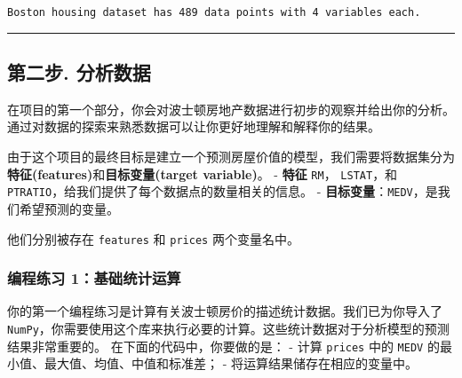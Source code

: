 \documentclass[11pt]{article}
\begin{document}
    \begin{Verbatim}[commandchars=\\\{\}]
Boston housing dataset has 489 data points with 4 variables each.

    \end{Verbatim}

    \begin{center}\rule{0.5\linewidth}{\linethickness}\end{center}

\subsection{第二步.
分析数据}\label{ux7b2cux4e8cux6b65.-ux5206ux6790ux6570ux636e}

在项目的第一个部分，你会对波士顿房地产数据进行初步的观察并给出你的分析。通过对数据的探索来熟悉数据可以让你更好地理解和解释你的结果。

由于这个项目的最终目标是建立一个预测房屋价值的模型，我们需要将数据集分为\textbf{特征(features)}和\textbf{目标变量(target
variable)}。 - \textbf{特征}
\texttt{\textquotesingle{}RM\textquotesingle{}}，
\texttt{\textquotesingle{}LSTAT\textquotesingle{}}，和
\texttt{\textquotesingle{}PTRATIO\textquotesingle{}}，给我们提供了每个数据点的数量相关的信息。
-
\textbf{目标变量}：\texttt{\textquotesingle{}MEDV\textquotesingle{}}，是我们希望预测的变量。

他们分别被存在 \texttt{features} 和 \texttt{prices} 两个变量名中。

    \subsubsection{编程练习
1：基础统计运算}\label{ux7f16ux7a0bux7ec3ux4e60-1ux57faux7840ux7edfux8ba1ux8fd0ux7b97}

你的第一个编程练习是计算有关波士顿房价的描述统计数据。我们已为你导入了
\texttt{NumPy}，你需要使用这个库来执行必要的计算。这些统计数据对于分析模型的预测结果非常重要的。
在下面的代码中，你要做的是： - 计算 \texttt{prices} 中的
\texttt{\textquotesingle{}MEDV\textquotesingle{}}
的最小值、最大值、均值、中值和标准差； - 将运算结果储存在相应的变量中。
\end{document}
